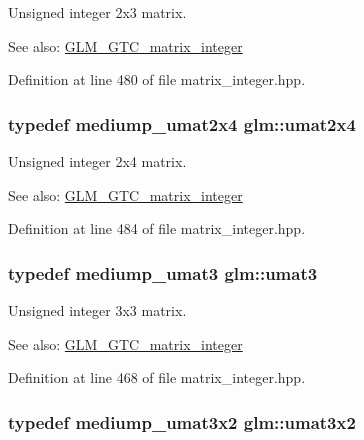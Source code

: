 Unsigned integer 2x3 matrix. \begin{Desc}
\item[See also:]\hyperlink{group__gtc__matrix__integer}{GLM\_\-GTC\_\-matrix\_\-integer} \end{Desc}


Definition at line 480 of file matrix\_\-integer.hpp.\hypertarget{group__gtc__matrix__integer_g3b23b164240cf4dfb429776da7be9d88}{
\subsubsection[umat2x4]{\setlength{\rightskip}{0pt plus 5cm}typedef mediump\_\-umat2x4 {\bf glm::umat2x4}}}
\label{group__gtc__matrix__integer_g3b23b164240cf4dfb429776da7be9d88}


Unsigned integer 2x4 matrix. \begin{Desc}
\item[See also:]\hyperlink{group__gtc__matrix__integer}{GLM\_\-GTC\_\-matrix\_\-integer} \end{Desc}


Definition at line 484 of file matrix\_\-integer.hpp.\hypertarget{group__gtc__matrix__integer_g8b8fbc858e28abf8fc344744f8d6d368}{
\subsubsection[umat3]{\setlength{\rightskip}{0pt plus 5cm}typedef mediump\_\-umat3 {\bf glm::umat3}}}
\label{group__gtc__matrix__integer_g8b8fbc858e28abf8fc344744f8d6d368}


Unsigned integer 3x3 matrix. \begin{Desc}
\item[See also:]\hyperlink{group__gtc__matrix__integer}{GLM\_\-GTC\_\-matrix\_\-integer} \end{Desc}


Definition at line 468 of file matrix\_\-integer.hpp.\hypertarget{group__gtc__matrix__integer_g257300f2710612877ef45438a366e308}{
\subsubsection[umat3x2]{\setlength{\rightskip}{0pt plus 5cm}typedef mediump\_\-umat3x2 {\bf glm::umat3x2}}}
\label{group__gtc__matrix__integer_g257300f2710612877ef45438a366e308}



